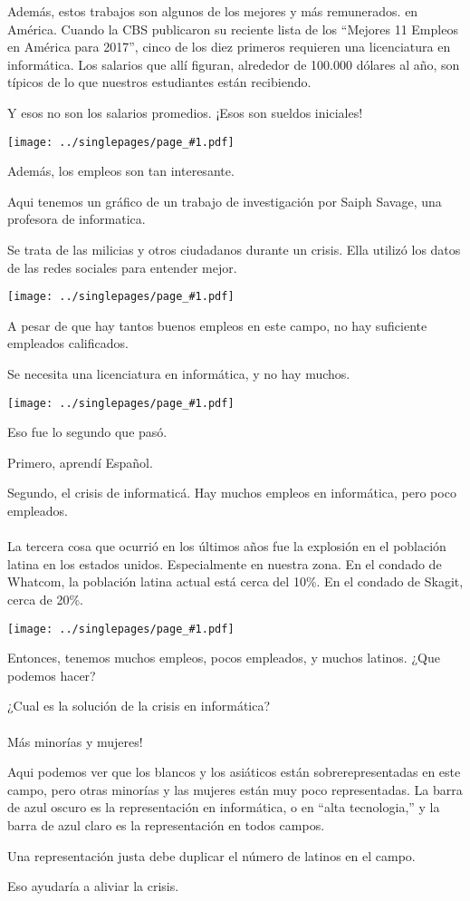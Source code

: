 \documentclass[12pt]{article}
\newcommand{\cue}{\mbox{}\\
  \fbox{\sf Next slide}
\\}
\newcommand{\fig}[1]{
  \newpage  
  \begin{center}
    \texttt{[image: ../singlepages/page\_\#1.pdf]}
  \end{center}
  
}
\begin{document}
Además, estos trabajos son algunos de los mejores y más remunerados.
en América.  Cuando la CBS publicaron su reciente lista de los
``Mejores 11 Empleos en América para 2017'', cinco de los diez
primeros requieren una licenciatura en informática.  Los salarios que
allí figuran, alrededor de 100.000 dólares al año, son típicos de lo
que nuestros estudiantes están recibiendo.

Y esos no son los salarios promedios.  ¡Esos son sueldos iniciales!


\fig{11}

Además, los empleos son tan interesante.

Aqui tenemos un gráfico de
un trabajo de investigación por Saiph Savage, una profesora de
informatica.

Se trata de las milicias y otros ciudadanos durante un
crisis.  Ella utilizó los datos de las redes sociales para entender
mejor.


\fig{12}

A pesar de que hay tantos buenos empleos en este campo,
no hay suficiente empleados calificados.

Se necesita una licenciatura en informática, y no hay muchos.


\fig{14}
Eso fue lo segundo que pasó.

Primero, aprendí Español.

Segundo, el crisis de informaticá.
Hay muchos empleos en informática, pero poco empleados.
\cue
La tercera cosa que ocurrió en los últimos años fue la explosión en el
población latina en los estados unidos.  Especialmente en nuestra
zona.  En el condado de Whatcom, la población latina actual está cerca
del 10\%.  En el condado de Skagit, cerca de 20\%. 

\fig{16}


Entonces, tenemos muchos empleos, pocos empleados, y muchos latinos.
¿Que podemos hacer?

¿Cual es la solución de la crisis en informática?
\cue
Más minorías y mujeres!

Aqui podemos ver que los blancos y los asiáticos están
sobrerepresentadas en este campo, pero otras minorías y las mujeres
están muy poco representadas.  La barra de azul oscuro es la
representación en informática, o en ``alta tecnologia,'' y la barra de
azul claro es la representación en todos campos.

Una representación justa debe duplicar el número de latinos en el
campo.

Eso ayudaría a aliviar la crisis.
\end{document}
